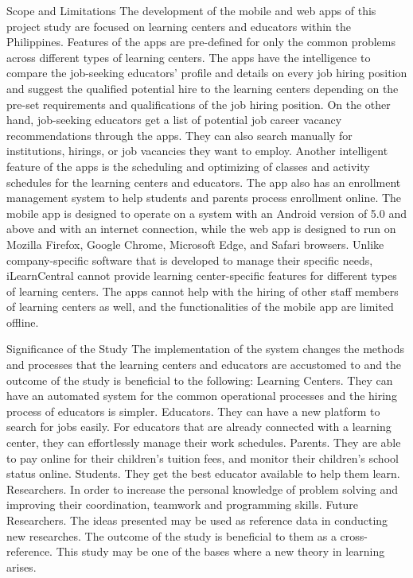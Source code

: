 Scope and Limitations
The development of the mobile and web apps of this project study are focused on learning centers and educators within the Philippines. Features of the apps are pre-defined for only the common problems across different types of learning centers. The apps have the intelligence to compare the job-seeking educators' profile and details on every job hiring position and suggest the qualified potential hire to the learning centers depending on the pre-set requirements and qualifications of the job hiring position. On the other hand, job-seeking educators get a list of potential job career vacancy recommendations through the apps. They can also search manually for institutions, hirings, or job vacancies they want to employ. 
Another intelligent feature of the apps is the scheduling and optimizing of classes and activity schedules for the learning centers and educators. The app also has an enrollment management system to help students and parents process enrollment online. The mobile app is designed to operate on a system with an Android version of 5.0 and above and with an internet connection, while the web app is designed to run on Mozilla Firefox, Google Chrome, Microsoft Edge, and Safari browsers.
Unlike company-specific software that is developed to manage their specific needs, iLearnCentral cannot provide learning center-specific features for different types of learning centers. The apps cannot help with the hiring of other staff members of learning centers as well, and the functionalities of the mobile app are limited offline.

Significance of the Study
The implementation of the system changes the methods and processes that the learning centers and educators are accustomed to and the outcome of the study is beneficial to the following: 
Learning Centers. They can have an automated system for the common operational processes and the hiring process of educators is simpler.
	Educators. They can have a new platform to search for jobs easily. For educators that are already connected with a learning center, they can effortlessly manage their work schedules.
	Parents. They are able to pay online for their children’s tuition fees, and monitor their children’s school status online.
	Students. They get the best educator available to help them learn.
	Researchers. In order to increase the personal knowledge of problem solving and improving their coordination, teamwork and programming skills.  
	Future Researchers. The ideas presented may be used as reference data in conducting new researches. The outcome of the study is beneficial to them as a cross-reference. This study may be one of the bases where a new theory in learning arises. 

